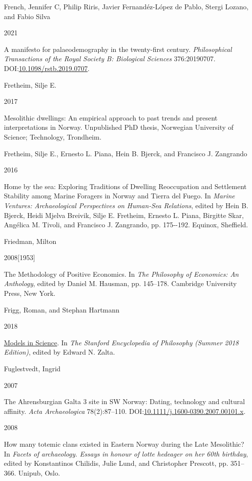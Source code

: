 \documentclass[
  a4paper,
  oneside]{uiophdthesis}
\newlength{\cslhangindent}
\newlength{\csllabelwidth}
\newlength{\cslentryspacingunit} %
\newenvironment{CSLReferences}[2] %
 {%
  \setlength{\parindent}{0pt}
  \ifodd #1
  \let\oldpar\par
  \def\par{\hangindent=\cslhangindent\oldpar}
  \fi
  \setlength{\parskip}{#2\cslentryspacingunit}
 }%
 {}
\newcommand{\CSLBlock}[1]{#1\hfill\break}
\newcommand{\CSLLeftMargin}[1]{\parbox[t]{\csllabelwidth}{#1}}
\newcommand{\CSLRightInline}[1]{\parbox[t]{\linewidth - \csllabelwidth}{#1}\break}
\begin{document}
\begin{CSLReferences}{0}{0}
\leavevmode{}%
\CSLBlock{French, Jennifer C, Philip Riris, Javier Fernandéz-López de Pablo, Stergi Lozano, and Fabio Silva}
\CSLLeftMargin{ 2021}
\CSLRightInline{A manifesto for palaeodemography in the twenty-first century. \emph{Philosophical Transactions of the Royal Society B: Biological Sciences} 376:20190707. DOI:\href{https://doi.org/10.1098/rstb.2019.0707}{10.1098/rstb.2019.0707}.}

\leavevmode{}%
\CSLBlock{Fretheim, Silje E.}
\CSLLeftMargin{ 2017}
\CSLRightInline{{Mesolithic dwellings: An empirical approach to past trends and present interpretations in Norway}. Unpublished PhD thesis, Norwegian University of Science; Technology, Trondheim.}

\leavevmode{}%
\CSLBlock{Fretheim, Silje E., Ernesto L. Piana, Hein B. Bjerck, and Francisco J. Zangrando}
\CSLLeftMargin{ 2016}
\CSLRightInline{{Home by the sea: Exploring Traditions of Dwelling Reoccupation and Settlement Stability among Marine Foragers in Norway and Tierra del Fuego}. In \emph{{Marine Ventures: Archaeological Perspectives on Human-Sea Relations}}, edited by Hein B. Bjerck, Heidi Mjelva Breivik, Silje E. Fretheim, Ernesto L. Piana, Birgitte Skar, Angélica M. Tivoli, and Francisco J. Zangrando, pp. 175-\/-192. Equinox, Sheffield.}

\leavevmode{}%
\CSLBlock{Friedman, Milton}
\CSLLeftMargin{ 2008{[}1953{]}}
\CSLRightInline{{The Methodology of Positive Economics}. In \emph{{The Philosophy of Economics: An Anthology}}, edited by Daniel M. Hausman, pp. 145--178. Cambridge University Press, New York.}

\leavevmode{}%
\CSLBlock{Frigg, Roman, and Stephan Hartmann}
\CSLLeftMargin{ 2018}
\CSLRightInline{\href{https://plato.stanford.edu/archives/sum2018/entries/models-science/}{{Models in Science}}. In \emph{{The Stanford Encyclopedia of Philosophy (Summer 2018 Edition)}}, edited by Edward N. Zalta.}

\leavevmode{}%
\CSLBlock{Fuglestvedt, Ingrid}
\CSLLeftMargin{ 2007}
\CSLRightInline{{The Ahrensburgian Galta 3 site in SW Norway: Dating, technology and cultural affinity}. \emph{Acta Archaeologica} 78(2):87--110. DOI:\href{https://doi.org/10.1111/j.1600-0390.2007.00101.x}{10.1111/j.1600-0390.2007.00101.x}.}

\leavevmode{}%
\CSLLeftMargin{ 2008 }
\CSLRightInline{{How many totemic clans existed in Eastern Norway during the Late Mesolithic?} In \emph{Facets of archaeology. Essays in honour of lotte hedeager on her 60th birthday}, edited by Konstantinos Chilidis, Julie Lund, and Christopher Prescott, pp. 351--366. Unipub, Oslo.}


\end{CSLReferences}
\end{document}
